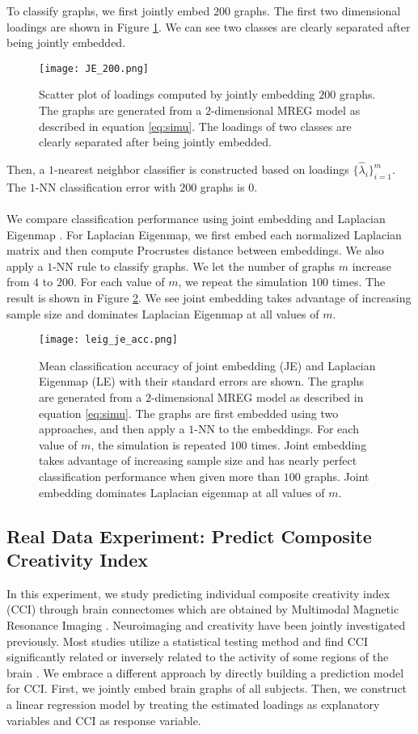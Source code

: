 \documentclass[10pt,journal,compsoc]{IEEEtran}
\begin{document}
\noindent To classify graphs, we first jointly embed $200$ graphs. The first two dimensional loadings are shown in Figure \ref{fig:load}. We can see two classes are clearly separated after being jointly embedded.
\begin{figure}[!htbp]
	\centering
	\texttt{[image: JE\_200.png]}
	\caption{Scatter plot of loadings computed by jointly embedding $200$ graphs. The graphs are generated from a $2$-dimensional MREG model as described in equation \ref{eq:simu}. The loadings of two classes are clearly separated after being jointly embedded. }
	\label{fig:load}
\end{figure}
Then, a $1$-nearest neighbor classifier is constructed based on loadings $\{\hat{\lambda}_i\}_{i=1}^m$. The $1$-NN classification error with $200$ graphs is $0$. \\
\\
\noindent We compare classification performance using joint embedding and Laplacian Eigenmap \cite{belkin2003laplacian}. For Laplacian Eigenmap, we first embed each normalized Laplacian matrix and then compute Procrustes distance between embeddings. We also apply a $1$-NN rule to classify graphs. We let the number of graphs $m$ increase from $4$ to $200$. For each value of $m$, we repeat the simulation $100$ times. The result is shown in Figure \ref{fig:acc}. We see joint embedding takes advantage of increasing sample size and dominates Laplacian Eigenmap at all values of $m$. 
\begin{figure}[!htbp]
	\centering
	\texttt{[image: leig\_je\_acc.png]}
	\caption{Mean classification accuracy of joint embedding (JE) and Laplacian Eigenmap (LE) with their standard errors are shown. The graphs are generated from a $2$-dimensional MREG model as described in equation \ref{eq:simu}. The graphs are first embedded using two approaches, and then apply a $1$-NN to the embeddings. For each value of $m$, the simulation is repeated $100$ times. Joint embedding takes advantage of increasing sample size and has nearly perfect classification performance when given more than $100$ graphs. Joint embedding dominates Laplacian eigenmap at all values of $m$.}
	\label{fig:acc}
\end{figure} 

\subsection{Real Data Experiment: Predict Composite Creativity Index}
In this experiment, we study predicting individual composite creativity index (CCI) through brain connectomes which are obtained by Multimodal Magnetic Resonance Imaging \cite{koutra2013d}. Neuroimaging and creativity have been jointly investigated previously. Most studies utilize a statistical testing method and find CCI significantly related or inversely related to the activity of some regions of the brain \cite{arden2010neuroimaging}. We embrace a different approach by directly building a prediction model for CCI. First, we jointly embed brain graphs of all subjects. Then, we construct a linear regression model by treating the estimated loadings as explanatory variables and CCI as response variable. \\
\end{document}
